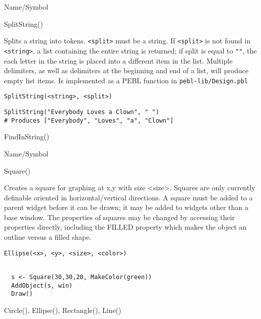 \begin{desc}{Name/Symbol}
\item[Name/Symbol]  	SplitString()

\item[Description]	Splits a string into tokens. \verb+<split>+ must be a string. If 
		\verb+<split>+ is not found in \verb+<string>+, a list containing the entire 
		string is returned; if split is equal to \verb+""+, the each letter 
		in the string is placed into a different item in the list.  
		Multiple delimiters, as well as delimiters at the beginning 
		and end of a list, will produce empty list items. 
		Is implemented as a PEBL function in \texttt{pebl-lib/Design.pbl}

\item[Usage]
\begin{verbatim}
SplitString(<string>, <split>)
\end{verbatim}

\item[Example]      	
\begin{verbatim}
SplitString("Everybody Loves a Clown", " ") 
# Produces ["Everybody", "Loves", "a", "Clown"]
\end{verbatim}

\item[See Also]     	FindInString()
\end{desc}

\rl




\begin{desc}{Name/Symbol}
\item[Name/Symbol]	Square()
  
\item[Description]	Creates a square for graphing at x,y with size
  <size>. Squares are only currently definable oriented in
  horizontal/vertical directions.  A square  must be added
  to a parent widget before it can be drawn; it may be added to
  widgets other than a base window.  The properties of squares may be
  changed by accessing their properties directly, including the FILLED
  property which makes the object an outline versus a filled shape.

\item[Usage]
\begin{verbatim}
Ellipse(<x>, <y>, <size>, <color>)
\end{verbatim}

\item[Example]	
\begin{verbatim}
  
  s <- Square(30,30,20, MakeColor(green))
  AddObject(s, win)
  Draw()

\end{verbatim}
\item[See Also]	 Circle(), Ellipse(), Rectangle(), Line()
\end{desc}

